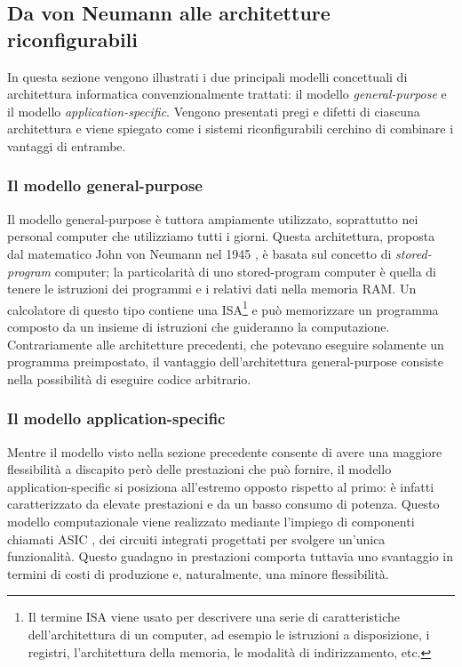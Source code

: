 \subsection{Da von Neumann alle architetture riconfigurabili}
\label{subsec:cambioParadigma}
In questa sezione vengono illustrati i due principali modelli concettuali di architettura
informatica convenzionalmente trattati: il modello \emph{general-purpose} e il modello
\emph{application-specific}. Vengono presentati pregi e difetti di ciascuna architettura
e viene spiegato come i sistemi riconfigurabili cerchino di combinare i vantaggi di
entrambe.

\subsubsection{Il modello general-purpose}
Il modello general-purpose è tuttora ampiamente utilizzato, soprattutto nei personal
computer che utilizziamo tutti i giorni. Questa architettura, proposta dal matematico
John von Neumann nel 1945 \cite{First-Draft-Report-EDVAC}, è basata sul concetto di
\emph{stored-program} computer; la particolarità di uno stored-program computer è quella
di tenere le istruzioni dei programmi e i relativi dati nella memoria RAM. Un calcolatore di
questo tipo contiene una \ac{ISA}\footnote{Il termine \acl{ISA} viene usato per descrivere
una serie di caratteristiche dell'architettura di un computer, ad esempio le istruzioni
a disposizione, i registri, l'architettura della memoria, le modalità di indirizzamento, etc.}
e può memorizzare un programma composto da un insieme di istruzioni che guideranno
la computazione. Contrariamente alle architetture precedenti, che potevano eseguire
solamente un programma preimpostato, il vantaggio dell'architettura general-purpose consiste
nella possibilità di eseguire codice arbitrario.

\subsubsection{Il modello application-specific}
Mentre il modello visto nella sezione precedente consente di avere una maggiore
flessibilità a discapito però delle prestazioni che può fornire, il modello
application-specific si posiziona all'estremo opposto rispetto al primo: è infatti
caratterizzato da elevate prestazioni e da un basso consumo di potenza. Questo modello
computazionale viene realizzato mediante l'impiego di componenti chiamati \ac{ASIC}
\cite{ASICMicroprocessors},
dei circuiti integrati progettati per svolgere un'unica funzionalità. Questo guadagno
in prestazioni comporta tuttavia uno svantaggio in termini di costi di produzione e,
naturalmente, una minore flessibilità.


